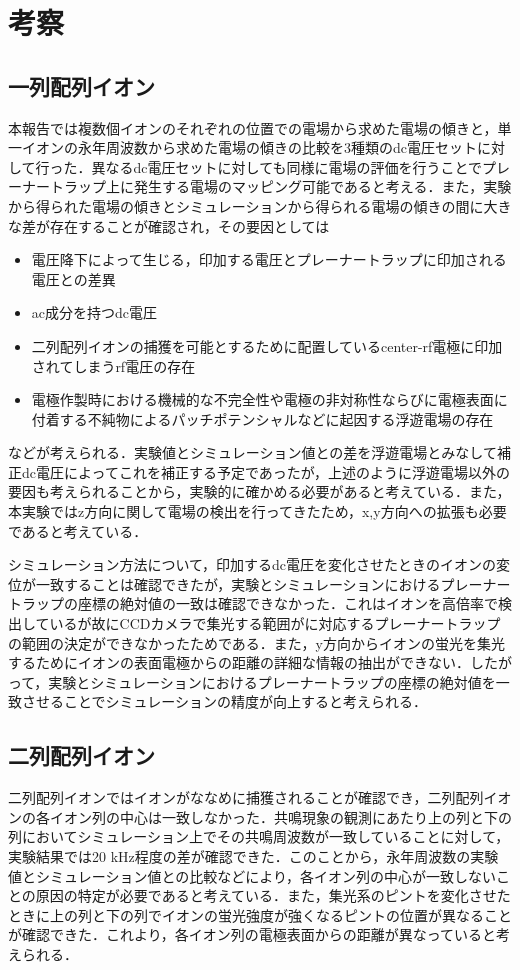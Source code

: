 \chapter{考察}
\section{一列配列イオン}
本報告では複数個イオンのそれぞれの位置での電場から求めた電場の傾きと，単一イオンの永年周波数から求めた電場の傾きの比較を3種類のdc電圧セットに対して行った．異なるdc電圧セットに対しても同様に電場の評価を行うことでプレーナートラップ上に発生する電場のマッピング可能であると考える．また，実験から得られた電場の傾きとシミュレーションから得られる電場の傾きの間に大きな差が存在することが確認され，その要因としては
\begin{itemize}
	\item 電圧降下によって生じる，印加する電圧とプレーナートラップに印加される電圧との差異
	\item ac成分を持つdc電圧
	\item 二列配列イオンの捕獲を可能とするために配置しているcenter-rf電極に印加されてしまうrf電圧の存在
	\item 電極作製時における機械的な不完全性や電極の非対称性ならびに電極表面に付着する不純物によるパッチポテンシャルなどに起因する浮遊電場の存在
\end{itemize}
などが考えられる．実験値とシミュレーション値との差を浮遊電場とみなして補正dc電圧によってこれを補正する予定であったが，上述のように浮遊電場以外の要因も考えられることから，実験的に確かめる必要があると考えている．また，本実験ではz方向に関して電場の検出を行ってきたため，x,y方向への拡張も必要であると考えている．
	
シミュレーション方法について，印加するdc電圧を変化させたときのイオンの変位が一致することは確認できたが，実験とシミュレーションにおけるプレーナートラップの座標の絶対値の一致は確認できなかった．これはイオンを高倍率で検出しているが故にCCDカメラで集光する範囲がに対応するプレーナートラップの範囲の決定ができなかったためである．また，y方向からイオンの蛍光を集光するためにイオンの表面電極からの距離の詳細な情報の抽出ができない．したがって，実験とシミュレーションにおけるプレーナートラップの座標の絶対値を一致させることでシミュレーションの精度が向上すると考えられる．

\section{二列配列イオン}
二列配列イオンではイオンがななめに捕獲されることが確認でき，二列配列イオンの各イオン列の中心は一致しなかった．共鳴現象の観測にあたり上の列と下の列においてシミュレーション上でその共鳴周波数が一致していることに対して，実験結果では20 kHz程度の差が確認できた．このことから，永年周波数の実験値とシミュレーション値との比較などにより，各イオン列の中心が一致しないことの原因の特定が必要であると考えている．また，集光系のピントを変化させたときに上の列と下の列でイオンの蛍光強度が強くなるピントの位置が異なることが確認できた．これより，各イオン列の電極表面からの距離が異なっていると考えられる．
